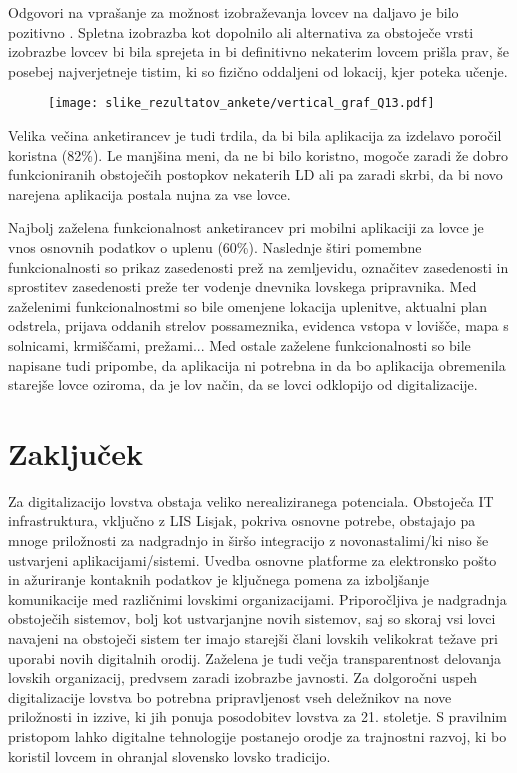 \documentclass[a4paper,12pt,openright]{book}
\begin{document}
Odgovori na vprašanje za možnost izobraževanja lovcev na daljavo je bilo pozitivno .
Spletna izobrazba kot dopolnilo ali alternativa za obstoječe vrsti izobrazbe lovcev bi bila sprejeta in bi definitivno nekaterim lovcem prišla prav, še posebej najverjetneje tistim, ki so fizično oddaljeni od lokacij, kjer poteka učenje.

\begin{figure}[H]
    \centering
    \texttt{[image: slike\_rezultatov\_ankete/vertical\_graf\_Q13.pdf]}
\end{figure}



Velika večina anketirancev je tudi trdila, da bi bila aplikacija za izdelavo poročil koristna (82\%). 
Le manjšina meni, da ne bi bilo koristno, mogoče zaradi že dobro funkcioniranih obstoječih postopkov nekaterih LD ali pa zaradi skrbi, da bi novo narejena aplikacija postala nujna za vse lovce.

Najbolj zaželena funkcionalnost anketirancev pri mobilni aplikaciji za lovce je vnos osnovnih podatkov o uplenu (60\%).
Naslednje štiri pomembne funkcionalnosti so prikaz zasedenosti prež na zemljevidu, označitev zasedenosti in sprostitev zasedenosti preže ter vodenje dnevnika lovskega pripravnika.
Med zaželenimi funkcionalnostmi so bile omenjene lokacija uplenitve, aktualni plan odstrela, prijava oddanih strelov possameznika, evidenca vstopa v lovišče, mapa s solnicami, krmiščami, prežami...
Med ostale zaželene funkcionalnosti so bile napisane tudi pripombe, da aplikacija ni potrebna in da bo aplikacija obremenila starejše lovce oziroma, da je lov način, da se lovci odklopijo od digitalizacije. 

\chapter{Zaključek}  

Za digitalizacijo lovstva obstaja veliko nerealiziranega potenciala.
Obstoječa IT infrastruktura, vključno z LIS Lisjak, pokriva osnovne potrebe, obstajajo pa mnoge priložnosti za nadgradnjo in širšo integracijo z novonastalimi/ki niso še ustvarjeni aplikacijami/sistemi.
Uvedba osnovne platforme za elektronsko pošto in ažuriranje kontaknih podatkov je ključnega pomena za izboljšanje komunikacije med različnimi lovskimi organizacijami.
Priporočljiva je nadgradnja obstoječih sistemov, bolj kot ustvarjanjne novih sistemov, saj so skoraj vsi lovci navajeni na obstoječi sistem ter imajo starejši člani lovskih velikokrat težave pri uporabi novih digitalnih orodij.
Zaželena je tudi večja transparentnost delovanja lovskih organizacij, predvsem zaradi izobrazbe javnosti.
Za dolgoročni uspeh digitalizacije lovstva bo potrebna pripravljenost vseh deležnikov na nove priložnosti in izzive, ki jih ponuja posodobitev lovstva za 21. stoletje.
S pravilnim pristopom lahko digitalne tehnologije postanejo orodje za trajnostni razvoj, ki bo koristil lovcem in ohranjal slovensko lovsko tradicijo.


\label{end}


\cleardoublepage


\printbibliography[heading=bibintoc]
\end{document}
